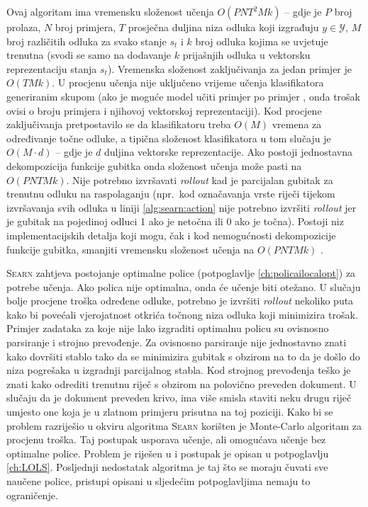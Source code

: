 Ovaj algoritam ima vremensku složenost učenja $O(P N T^2 M k)$ -- gdje je $P$
broj prolaza, $N$ broj primjera, $T$ prosječna duljina niza odluka koji
izgrađuju $y \in \mathcal{Y}$, $M$ broj različitih odluka za svako stanje $s_t$
i $k$ broj odluka kojima se uvjetuje trenutna (svodi se samo na dodavanje $k$
prijašnjih odluka u vektorsku reprezentaciju stanja $s_t$). Vremenska složenost
zaključivanja za jedan primjer je $O(T M k)$. U procjenu učenja nije uključeno
vrijeme učenja klasifikatora generiranim skupom (ako je moguće model učiti
primjer po primjer , onda trošak ovisi o broju primjera i njihovoj
vektorskoj reprezentaciji). Kod procjene zaključivanja pretpostavilo se da
klasifikatoru treba $O(M)$ vremena za određivanje točne odluke, a tipična
složenost klasifikatora u tom slučaju je $O(M \cdot d)$ -- gdje je $d$ duljina
vektorske reprezentacije. Ako postoji jednostavna dekompozicija funkcije gubitka
onda složenost učenja može pasti na $O(P N T M k)$. Nije potrebno izvršavati
\textit{rollout} kad je parcijalan gubitak za trenutnu odluku na raspolaganju
(npr.~kod označavanja vrste riječi tijekom izvršavanja svih odluka u liniji
\ref{alg:searn:action} nije potrebno izvršiti \textit{rollout} jer je
gubitak na pojedinoj odluci 1 ako je netočna ili 0 ako je točna). Postoji niz
implementacijskih detalja koji mogu, čak i kod nemogućnosti dekompozicije
funkcije gubitka, smanjiti vremensku složenost učenja na $O(P N T M k)$
\citep{daume14lts}.

\textsc{Searn} zahtjeva postojanje optimalne police (potpoglavlje
\ref{ch:policailocalopt}) za potrebe učenja. Ako polica nije optimalna, onda će
učenje biti otežano. U slučaju bolje procjene troška određene odluke, potrebno je
izvršiti \textit{rollout} nekoliko puta kako bi povećali vjerojatnost otkrića
točnong niza odluka koji minimizira trošak. Primjer zadataka za koje nije lako
izgraditi optimalnu policu su ovisnosno parsiranje i strojno prevođenje. Za
ovisnosno parsiranje nije jednostavno znati kako dovršiti stablo tako da se
minimizira gubitak s obzirom na to da je došlo do niza pogrešaka u izgradnji
parcijalnog stabla. Kod strojnog prevođenja teško je znati kako odrediti
trenutnu riječ s obzirom na polovično preveden dokument. U slučaju da je
dokument preveden krivo, ima više smisla staviti neku drugu riječ umjesto
one koja je u zlatnom primjeru prisutna na toj poziciji. Kako bi se problem
razriješio u okviru algoritma \textsc{Searn} korišten je Monte-Carlo algoritam
za procjenu troška. Taj postupak usporava učenje, ali omogućava učenje bez
optimalne police. Problem je riješen u \citep{daume15lols} i postupak je opisan
u potpoglavlju \ref{ch:LOLS}. Posljednji nedostatak algoritma je taj što se
moraju čuvati sve naučene police, pristupi opisani u sljedećim potpoglavljima
nemaju to ograničenje.

